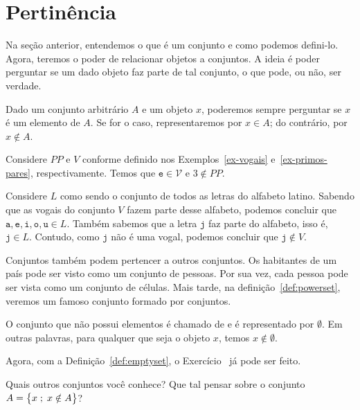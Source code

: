 \section{Pertinência}

Na seção anterior, entendemos o que é um conjunto e como podemos defini-lo. Agora, teremos o poder de relacionar objetos a conjuntos. A ideia é poder perguntar se um dado objeto faz parte de tal conjunto, o que pode, ou não, ser verdade.

\begin{definition}
\label{def:in}
Dado um conjunto arbitrário $A$ e um objeto $x$,
poderemos sempre perguntar se $x$ é um elemento de $A$. Se for o caso, representaremos por $x \in A$; do contrário, por $x \notin A$.
\end{definition}

\begin{example}
Considere $PP$ e $V$ conforme definido nos Exemplos~\ref{ex-vogais} e~\ref{ex-primos-pares}, respectivamente. Temos que $\texttt{e} \in \mathcal{V}$ e $3 \notin PP$.
\end{example}

\begin{example}
Considere $L$ como sendo o conjunto de todos as letras do alfabeto latino.
Sabendo que as vogais do conjunto $V$ fazem parte desse alfabeto, podemos concluir que $\texttt{a}, \texttt{e}, \texttt{i}, \texttt{o}, \texttt{u} \in L$.
Também sabemos que a letra $\texttt{j}$ faz parte do alfabeto, isso é, $\texttt{j} \in L$.
Contudo, como $\texttt{j}$ não é uma vogal, podemos concluir que $\texttt{j} \notin V$.

\end{example}

\begin{example}
Conjuntos também podem pertencer a outros conjuntos.
Os habitantes de um país pode ser visto como um conjunto de pessoas.
Por sua vez, cada pessoa pode ser vista como um conjunto de células.
Mais tarde, na definição~\ref{def:powerset}, veremos um famoso conjunto formado por conjuntos.
\end{example}

\begin{definition}
\label{def:emptyset}
O conjunto que não possui elementos é chamado de  e é representado por $\emptyset$.
Em outras palavras, para qualquer que seja o objeto $x$, temos $x \notin \emptyset$.
\end{definition}

Agora, com a Definição~\ref{def:emptyset}, o Exercício~ já pode ser feito.

\begin{example}
Quais outros conjuntos você conhece? Que tal pensar sobre o conjunto $A = \left\{ x \;;\; x \notin A\right\}$?
\end{example}

